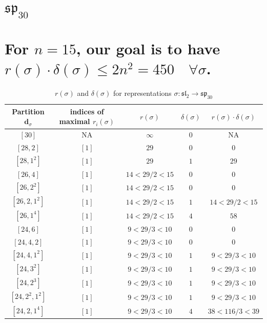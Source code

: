 \documentclass{article}%
\begin{document}
%
\section{$\mathfrak{sp}_{30}$}%
\section*{For $n=15$, our goal is to have $r(\sigma) \cdot \delta(\sigma) \leq 2n^2 = 450 \quad \forall \sigma$.}%

%
\linebreak%

    \begin{center}
    \label{table:sp_30}
    \begin{longtable}{||c|c|c|c|c||}
    \caption{$r(\sigma)$ and $\delta(\sigma)$ for representations $\sigma: \mathfrak{sl}_2 \to \mathfrak{sp}_{30}$}
    \hline
    Partition $\textbf{d}_\sigma$
    &indices of maximal $r_i(\sigma)$
    &$r(\sigma)$
    &$\delta(\sigma)$
    &$r(\sigma) \cdot \delta(\sigma)$
    \\ [0.3ex] \hline\endhead
    $[30]$ & NA & $\infty$ & $0$ & NA \\ \hline 
$[28, 2]$ & $[1]$ & $29$ & $0$ & $0$ \\ \hline 
$[28, 1^{2}]$ & $[1]$ & $29$ & $1$ & $29$ \\ \hline 
$[26, 4]$ & $[1]$ & $14 < 29/2 < 15$ & $0$ & $0$ \\ \hline 
$[26, 2^{2}]$ & $[1]$ & $14 < 29/2 < 15$ & $0$ & $0$ \\ \hline 
$[26, 2, 1^{2}]$ & $[1]$ & $14 < 29/2 < 15$ & $1$ & $14 < 29/2 < 15$ \\ \hline 
$[26, 1^{4}]$ & $[1]$ & $14 < 29/2 < 15$ & $4$ & $58$ \\ \hline 
$[24, 6]$ & $[1]$ & $9 < 29/3 < 10$ & $0$ & $0$ \\ \hline 
$[24, 4, 2]$ & $[1]$ & $9 < 29/3 < 10$ & $0$ & $0$ \\ \hline 
$[24, 4, 1^{2}]$ & $[1]$ & $9 < 29/3 < 10$ & $1$ & $9 < 29/3 < 10$ \\ \hline 
$[24, 3^{2}]$ & $[1]$ & $9 < 29/3 < 10$ & $1$ & $9 < 29/3 < 10$ \\ \hline 
$[24, 2^{3}]$ & $[1]$ & $9 < 29/3 < 10$ & $1$ & $9 < 29/3 < 10$ \\ \hline 
$[24, 2^{2}, 1^{2}]$ & $[1]$ & $9 < 29/3 < 10$ & $1$ & $9 < 29/3 < 10$ \\ \hline 
$[24, 2, 1^{4}]$ & $[1]$ & $9 < 29/3 < 10$ & $4$ & $38 < 116/3 < 39$ \\ \hline 

\end{longtable}
\end{center}
\end{document}
